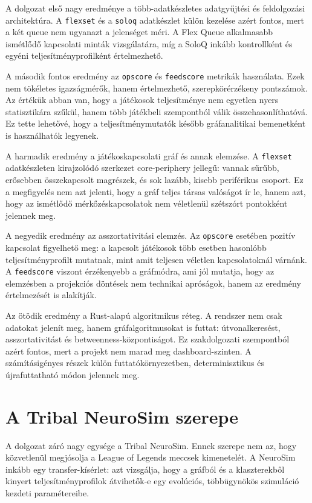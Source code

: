 ﻿\documentclass[a4paper,12pt]{report}
\begin{document}
A dolgozat első nagy eredménye a több-adatkészletes adatgyűjtési és feldolgozási architektúra.
A \texttt{flexset} és a \texttt{soloq} adatkészlet külön kezelése azért fontos, mert a két queue
nem ugyanazt a jelenséget méri. A Flex Queue alkalmasabb ismétlődő kapcsolati minták vizsgálatára,
míg a SoloQ inkább kontrollként és egyéni teljesítményprofilként értelmezhető.

A második fontos eredmény az \texttt{opscore} és \texttt{feedscore} metrikák használata.
Ezek nem tökéletes igazságmérők, hanem értelmezhető, szerepkörérzékeny pontszámok. Az értékük abban
van, hogy a játékosok teljesítménye nem egyetlen nyers statisztikára szűkül, hanem több játékbeli
szempontból válik összehasonlíthatóvá. Ez tette lehetővé, hogy a teljesítménymutatók később
gráfanalitikai bemenetként is használhatók legyenek.

A harmadik eredmény a játékoskapcsolati gráf és annak elemzése. A \texttt{flexset} adatkészleten
kirajzolódó szerkezet core-periphery jellegű: vannak sűrűbb, erősebben összekapcsolt magrészek,
és sok lazább, kisebb periférikus csoport. Ez a megfigyelés nem azt jelenti, hogy a gráf teljes
társas valóságot ír le, hanem azt, hogy az ismétlődő mérkőzéskapcsolatok nem véletlenül szétszórt
pontokként jelennek meg.

A negyedik eredmény az asszortativitási elemzés. Az \texttt{opscore} esetében pozitív kapcsolat
figyelhető meg: a kapcsolt játékosok több esetben hasonlóbb teljesítményprofilt mutatnak, mint amit
teljesen véletlen kapcsolatoknál várnánk. A \texttt{feedscore} viszont érzékenyebb a gráfmódra,
ami jól mutatja, hogy az elemzésben a projekciós döntések nem technikai apróságok, hanem az
eredmény értelmezését is alakítják.

Az ötödik eredmény a Rust-alapú algoritmikus réteg. A rendszer nem csak adatokat jelenít meg,
hanem gráfalgoritmusokat is futtat: útvonalkeresést, asszortativitást és betweenness-központiságot.
Ez szakdolgozati szempontból azért fontos, mert a projekt nem marad meg dashboard-szinten.
A számításigényes részek külön futtatókörnyezetben, determinisztikus és újrafuttatható módon
jelennek meg.

\section{A Tribal NeuroSim szerepe}

A dolgozat záró nagy egysége a Tribal NeuroSim. Ennek szerepe nem az, hogy közvetlenül
megjósolja a League of Legends meccsek kimenetelét. A NeuroSim inkább egy transfer-kísérlet:
azt vizsgálja, hogy a gráfból és a klaszterekből kinyert teljesítményprofilok átvihetők-e egy
evolúciós, többügynökös szimuláció kezdeti paramétereibe.
\end{document}
